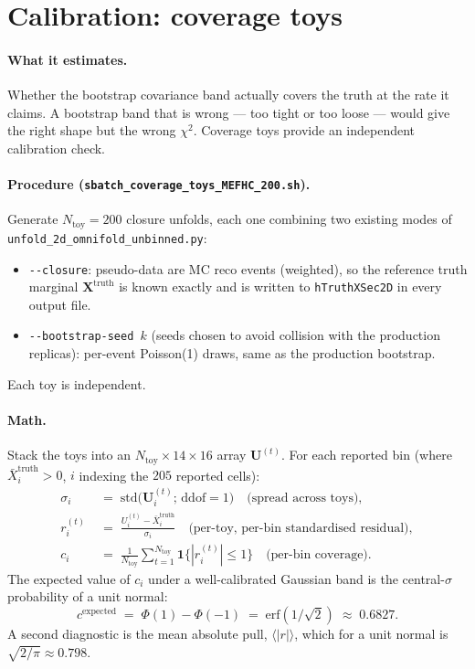 \documentclass[12pt]{article}
\begin{document}
\section{Calibration: coverage toys}
\label{sec:coverage}

\paragraph{What it estimates.}
Whether the bootstrap covariance band actually covers the truth at
the rate it claims. A bootstrap band that is wrong --- too tight or
too loose --- would give the right shape but the wrong $\chi^{2}$.
Coverage toys provide an independent calibration check.

\paragraph{Procedure (\texttt{sbatch\_coverage\_toys\_MEFHC\_200.sh}).}
Generate $N_{\text{toy}}=200$ closure unfolds, each one combining two
existing modes of \texttt{unfold\_2d\_omnifold\_unbinned.py}:
\begin{itemize}[nosep]
  \item \texttt{-{}-closure}: pseudo-data are MC reco events
        (weighted), so the reference truth marginal
        $\mathbf{X}^{\text{truth}}$ is known exactly and is written
        to \texttt{hTruthXSec2D} in every output file.
  \item \texttt{-{}-bootstrap-seed $k$} (seeds chosen to avoid
        collision with the production replicas): per-event Poisson(1)
        draws, same as the production bootstrap.
\end{itemize}
Each toy is independent.

\paragraph{Math.}
Stack the toys into an $N_{\text{toy}}\times14\times16$ array
$\mathbf{U}^{(t)}$. For each reported bin (where
$\bar X^{\text{truth}}_{i}>0$, $i$ indexing the $205$ reported cells):
\begin{align}
\sigma_{i}
\;&=\;
\mathrm{std}\big(\mathbf{U}^{(t)}_{i}; \,\text{ddof}=1\big)
\quad\text{(spread across toys)},
\\
r^{(t)}_{i}
\;&=\;
\frac{U^{(t)}_{i} - \bar X^{\text{truth}}_{i}}{\sigma_{i}}
\quad\text{(per-toy, per-bin standardised residual)},
\\
c_{i}
\;&=\;
\frac{1}{N_{\text{toy}}}
\sum_{t=1}^{N_{\text{toy}}} \mathbf{1}\!\big\{|r^{(t)}_{i}| \le 1\big\}
\quad\text{(per-bin coverage)}.
\end{align}
The expected value of $c_{i}$ under a well-calibrated Gaussian band
is the central-$\sigma$ probability of a unit normal:
\begin{equation}
c^{\text{expected}}
\;=\;
\Phi(1) - \Phi(-1)
\;=\;
\mathrm{erf}(1/\sqrt 2)
\;\approx\;
0.6827.
\end{equation}
A second diagnostic is the mean absolute pull,
$\langle |r| \rangle$, which for a unit normal is
$\sqrt{2/\pi}\approx 0.798$.
\end{document}

